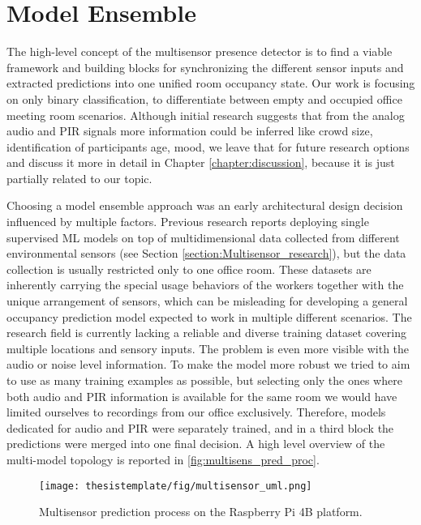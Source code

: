 \section{Model Ensemble}


The high-level concept of the multisensor presence detector is to find a viable framework and building blocks for synchronizing the different sensor inputs and extracted predictions into one unified room occupancy state. Our work is focusing on only binary classification, to differentiate between empty and occupied office meeting room scenarios. Although initial research suggests that from the analog audio and PIR signals more information could be inferred like crowd size, identification of participants age, mood, we leave that for future research options and discuss it more in detail in Chapter \ref{chapter:discussion}, because it is just partially related to our topic.

Choosing a model ensemble approach was an early architectural design decision influenced by multiple factors. Previous research reports deploying single supervised ML models on top of multidimensional data collected from different environmental sensors (see Section \ref{section:Multisensor_research}), but the data collection is usually restricted only to one office room. These datasets are inherently carrying the special usage behaviors of the workers together with the unique arrangement of sensors, which can be misleading for developing a general occupancy prediction model expected to work in multiple different scenarios. The research field is currently lacking a reliable and diverse training dataset covering multiple locations and sensory inputs. The problem is even more visible with the audio or noise level information. To make the model more robust we tried to aim to use as many training examples as possible, but selecting only the ones where both audio and PIR information is available for the same room we would have limited ourselves to recordings from our office exclusively. Therefore, models dedicated for audio and PIR were separately trained, and in a third block the predictions were merged into one final decision. A high level overview of the multi-model topology is reported in \autoref{fig:multisens_pred_proc}.

\begin{figure}[ht!]
  \begin{center}
    \texttt{[image: thesistemplate/fig/multisensor\_uml.png]}
    \caption{Multisensor prediction process on the Raspberry Pi 4B platform.}
    \label{fig:multisens_pred_proc}
  \end{center}
\end{figure}

